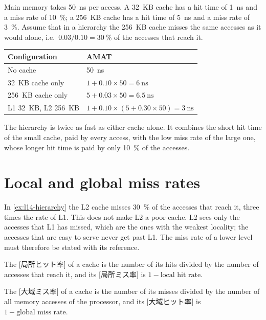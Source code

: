 \documentclass[../main.tex]{subfiles}
\begin{document}
\begin{example}
  \label{ex:l14-hierarchy}
  Main memory takes \SI{50}{\nano\second} per access.  A 32~KB cache has a
  hit time of \SI{1}{\nano\second} and a miss rate of \SI{10}{\percent}; a
  256~KB cache has a hit time of \SI{5}{\nano\second} and a miss rate of
  \SI{3}{\percent}.  Assume that in a hierarchy the 256~KB cache misses the
  same accesses as it would alone, i.e.\ $0.03/0.10 = \SI{30}{\percent}$ of
  the accesses that reach it.
  \begin{center}\small
    \begin{tabular}{@{}ll@{}}
      \toprule
      Configuration & AMAT \\
      \midrule
      No cache                      & \SI{50}{\nano\second} \\
      32~KB cache only              & $1 + 0.10\times 50 = \SI{6}{\nano\second}$ \\
      256~KB cache only             & $5 + 0.03\times 50 = \SI{6.5}{\nano\second}$ \\
      L1 32~KB, L2 256~KB           & $1 + 0.10\times(5 + 0.30\times 50) = \SI{3}{\nano\second}$ \\
      \bottomrule
    \end{tabular}
  \end{center}
  The hierarchy is twice as fast as either cache alone.  It combines the
  short hit time of the small cache, paid by every access, with the low miss
  rate of the large one, whose longer hit time is paid by only
  \SI{10}{\percent} of the accesses.
\end{example}

\section{Local and global miss rates}
\label{sec:l14-local-global}

In \cref{ex:l14-hierarchy} the L2 cache misses \SI{30}{\percent} of the
accesses that reach it, three times the rate of L1.  This does not make L2 a poor cache.  L2 sees only the
accesses that L1 has missed, which are the ones with the weakest locality; the
accesses that are easy to serve never get past L1.  The miss rate of a lower
level must therefore be stated with its reference.

\begin{definition}
  The [局所ヒット率] of a cache is the number of its hits
  divided by the number of accesses that reach it, and its
  [局所ミス率] is $1 - \text{local hit rate}$.

  The [大域ミス率] of a cache is the number of its
  misses divided by the number of all memory accesses of the processor, and
  its [大域ヒット率] is $1 - \text{global miss rate}$.
\end{definition}
\end{document}
